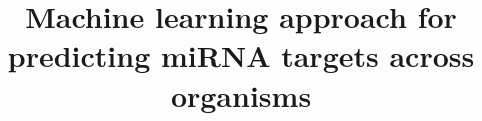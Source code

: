 \documentclass{bmcart}
\begin{document}
\begin{frontmatter}

\begin{fmbox}


\title{Machine learning approach for predicting miRNA targets across organisms}    


\author[
   addressref={aff1},                   %
   corref={aff1},                       %
   noteref={n1},                        %
   email={benorgi@post.bgu.ac.il}   %
]{ }

\author[
 addressref={aff2},
  corref={aff2},                       %
   noteref={n2},                        %
   email={vaksler@post.bgu.ac.il}
]{ }


\address[id=aff1]{%
  , %
  ,                              %
}



\end{fmbox}
\end{frontmatter}
\end{document}
